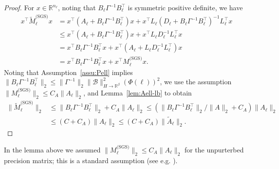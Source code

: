 \documentclass[11pt,english]{article}
\theoremstyle{plain}
\theoremstyle{plain}
\theoremstyle{plain}
\theoremstyle{plain}
\numberwithin{equation}{section}
\begin{document}
\begin{proof}
	For $x\in\mathbb{R}^{n_{\ell}}$, noting that $B_{\ell}\Gamma^{-1}B_{\ell}^{\top}$
	is symmetric positive definite, we have
	\begin{align*}
		x^{\top}\widetilde{M}_{\ell}^{\text{(SGS)}}x & =x^{\top}(A_{\ell}+B_{\ell}\Gamma^{-1}B_{\ell}^{\top})x+x^{\top}L_{\ell}\left(D_{\ell}+B_{\ell}\Gamma^{-1}B_{\ell}^{\top}\right)^{-1}L_{\ell}^{\top}x \\
		                                                               & \leq x^{\top}(A_{\ell}+B_{\ell}\Gamma^{-1}B_{\ell}^{\top})x+x^{\top}L_{\ell}D_{\ell}^{-1}L_{\ell}^{\top}x                                              \\
		                                                               & =x^{\top}B_{\ell}\Gamma^{-1}B_{\ell}^{\top}x+x^{\top}(A_{\ell}+L_{\ell}D_{\ell}^{-1}L_{\ell}^{\top})x                                                 \\
		                                                               & =x^{\top}B_{\ell}\Gamma^{-1}B_{\ell}^{\top}x+x^{\top}M_{\ell}^{\text{(SGS)}}x.
	\end{align*}
	Noting that Assumption~\ref{assu:Pell} implies $\|B_{\ell}\Gamma^{-1}B_{\ell}^{\top}\|_{2}\leq\|\Gamma^{-1}\|_{2}\|\mathcal{B}\|_{H\to\mathbb{R}^{\beta}}^{2}(\Phi(\ell))^{2}$,
	we use the assumption $\|M_{\ell}^{\text{(SGS)}}\|_{2}\leq C_{A}\|A_{\ell}\|_{2}$,
	and Lemma~\ref{lem:Aell-lb} to obtain
	\begin{align*}
		\|\widetilde{M}_{\ell}^{\text{(SGS)}}\|_{2} & \leq\|B_{\ell}\Gamma^{-1}B_{\ell}^{\top}\|_{2}+C_{A}\|A_{\ell}\|_{2}             \leq(\|B_{\ell}\Gamma^{-1}B_{\ell}^{\top}\|_{2}/\|A\|_{2}+C_{A})\|A_{\ell}\|_{2} \\
		                                            & \leq(C+C_{A})\|A_{\ell}\|_{2}\leq(C+C_{A})\|\widetilde{A}_{\ell}\|_{2}.
	\end{align*}
\end{proof}
In the lemma above we assumed $\|M_{\ell}^{\text{(SGS)}}\|_{2}\leq C_{A}\|A_{\ell}\|_{2}$
for the unpurterbed precision matrix; this is a standard assumption (see e.g. \cite[Theorem 11.30]{Hackbusch.W_2016_IterativeSolutionLarge}).
\end{document}
